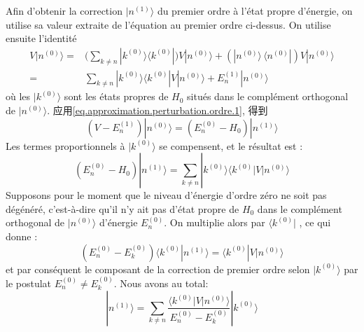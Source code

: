 Afin d'obtenir la correction $\scriptstyle \mid n^{(1)}\rangle$ du premier ordre \`a l'\'etat propre d'\'energie, on utilise sa valeur extraite de l'\'equation au premier ordre ci-dessus. On utilise ensuite l'identit\'e
$$
\begin{aligned}
V|n^{(0)}\rangle
= & \Big( \sum_{k\ne n} |k^{(0)}\rangle\langle k^{(0)}| \Big) V|n^{(0)}\rangle  + \left(|n^{(0)}\rangle\, \langle n^{(0)}|\right)  V|n^{(0)}\rangle \\
= & \sum_{k\ne n} |k^{(0)}\rangle\langle k^{(0)}| V|n^{(0)}\rangle  + E_n^{(1)} |n^{(0)}\rangle
\end{aligned}
$$
o\`u les $\scriptstyle |k^{(0)}\rangle$ sont les \'etats propres de $\scriptstyle H_0$ situ\'es dans le compl\'ement orthogonal de $\scriptstyle |n^{(0)}\rangle$.
应用\eqref{eq.approximation.perturbation.ordre.1}, 得到
$$
(V - E_n^{(1)})|n^{(0)}\rangle = (E_n^{(0)} - H_0) |n^{(1)}\rangle
$$
Les termes proportionnels \`a $\scriptstyle |k^{(0)}\rangle$ se compensent, et le r\'esultat est :
$$
 \left(E_n^{(0)} - H_0 \right) |n^{(1)}\rangle = \sum_{k \ne n} |k^{(0)}\rangle \langle k^{(0)}|V|n^{(0)} \rangle
$$
Supposons pour le moment que le niveau d'\'energie d'ordre z\'ero ne soit pas d\'eg\'en\'er\'e, c'est-\`a-dire qu'il n'y ait pas d'\'etat propre de $\scriptstyle H_0$ dans le compl\'ement orthogonal de $\scriptstyle |n^{(0)}\rangle$ d'\'energie $\scriptstyle E_n^{(0)}$. On multiplie alors par $\scriptstyle \langle k^{(0)}|$ , ce qui donne :
$$
 \left(E_n^{(0)} - E_k^{(0)}  \right) \langle k^{(0)}|n^{(1)}\rangle =  \langle k^{(0)}|V|n^{(0)} \rangle
$$
et par cons\'equent le composant de la correction de premier ordre selon $\scriptstyle |k^{(0)}\rangle$  par le postulat $\scriptstyle  E_n^{(0)} \ne E_k^{(0)}$. Nous avons au total:
\begin{equation}
 |n^{(1)}\rangle = \sum_{k \ne n} \frac{\langle k^{(0)}|V|n^{(0)} \rangle}{E_n^{(0)} - E_k^{(0)}} |k^{(0)}\rangle
\end{equation}
